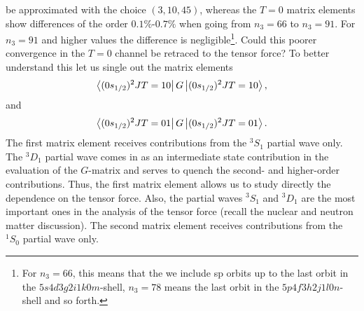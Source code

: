 be approximated with the choice $(3,10,45)$, whereas the $T=0$
matrix elements show differences of the order $0.1\%$-$0.7\%$ 
when going from
$n_3=66$ to $n_3=91$. For $n_3=91$ and higher values 
the difference is negligible\footnote{For $n_3=66$, this means that the
we include sp orbits up to the last orbit in the $5s4d3g2i1k0m$-shell,
$n_3=78$ means the last orbit in the $5p4f3h2j1l0n$-shell and so
forth.}.
Could this poorer convergence in the $T=0$ channel be retraced to the
tensor force? To better understand this let us single out the
matrix elements
\begin{equation}
     \left\langle (0s_{1/2})^{2}JT=10 \right|G\left| (0s_{1/2})^{2}JT=10 \right\rangle,
\end{equation}
and
\begin{equation}
    \left\langle (0s_{1/2})^{2}JT=01 \right|G\left| (0s_{1/2})^{2}JT=01 \right\rangle.
\end{equation}
The first matrix element receives contributions from 
the $^{3}S_1$ partial wave only. The $^{3}D_1$ partial wave comes
in as an intermediate state contribution in the evaluation of the
$G$-matrix and serves to quench the second- and higher-order
contributions. Thus, the first matrix element allows us to study
directly the dependence on the tensor force. Also, the partial
waves $^{3}S_1$ and $^{3}D_1$ are the most important ones in
the analysis of the tensor force (recall the nuclear and neutron matter
discussion). The second matrix element receives contributions from
the $^{1}S_0$ partial wave only.


